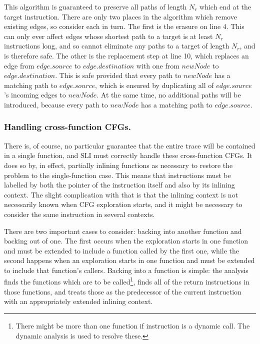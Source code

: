 This algorithm is guaranteed to preserve all paths of length $N_r$
which end at the target instruction.  There are only two places in the
algorithm which remove existing edges, so consider each in turn.  The
first is the erasure on line 4.  This can only ever affect edges whose
shortest path to a target is at least $N_r$ instructions long, and so
cannot eliminate any paths to a target of length $N_r$, and is
therefore safe.  The other is the replacement step at line 10, which
replaces an edge from $edge.source$ to $edge.destination$ with one
from $newNode$ to $edge.destination$.  This is safe provided that
every path to $newNode$ has a matching path to $edge.source$, which is
ensured by duplicating all of $edge.source$'s incoming edges to
$newNode$.  At the same time, no additional paths will be introduced,
because every path to $newNode$ has a matching path to $edge.source$.


\subsubsection{Handling cross-function CFGs.}

There is, of course, no particular guarantee that the entire trace
will be contained in a single function, and SLI must correctly handle
these cross-function CFGs.  It does so by, in effect, partially
inlining functions as necessary to restore the problem to the
single-function case.  This means that instructions must be labelled
by both the pointer of the instruction itself and also by its inlining
context.  The slight complication with that is that the inlining
context is not necessarily known when CFG exploration starts, and it
might be necessary to consider the same instruction in several
contexts.


There are two important cases to consider: backing into another
function and backing out of one.  The first occurs when the
exploration starts in one function and must be extended to include a
function called by the first one, while the second happens when an
exploration starts in one function and must be extended to include
that function's callers.  Backing into a function is simple: the
analysis finds the functions which are to be called\footnote{There
  might be more than one function if instruction is a dynamic call.
  The dynamic analysis is used to resolve these.}, finds all of the
return instructions in those functions, and treats those as the
predecessor of the current instruction with an appropriately extended
inlining context.

